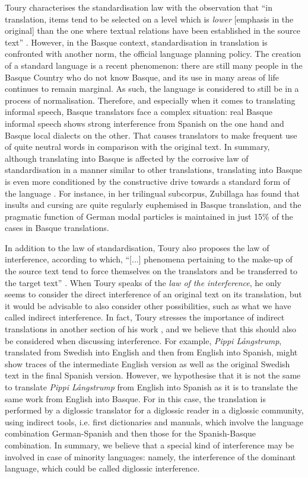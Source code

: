 \documentclass[output=paper]{LSP/langsci}
\begin{document}
Toury characterises the standardisation law with the observation that “in translation, items tend to be selected on a level which is \emph{lower} [emphasis in the original] than the one where textual relations have been established in the source text” \citep[305]{Toury2012}. However, in the Basque context, standardisation in translation is confronted with another norm, the official language planning policy. The creation of a standard language is a recent phenomenon: there are still many people in the Basque Country who do not know Basque, and its use in many areas of life continues to remain marginal. As such, the language is considered to still be in a process of normalisation. Therefore, and especially when it comes to translating informal speech, Basque translators face a complex situation: real Basque informal speech shows strong interference from Spanish on the one hand and Basque local dialects on the other. That causes translators to make frequent use of quite neutral words in comparison with the original text. In summary, although translating into Basque is affected by the corrosive law of standardisation in a manner similar to other translations, translating into Basque is even more conditioned by the constructive drive towards a standard form of the language \citep{Barambones2012}. For instance, in her trilingual subcorpus, Zubillaga has found that insults and cursing are quite regularly euphemised in Basque translation, and the pragmatic function of German modal particles is maintained in just 15\% of the cases in Basque translations.

In addition to the law of standardisation, Toury also proposes the law of interference, according to which, “[...] phenomena pertaining to the make-up of the source text tend to force themselves on the translators and be transferred to the target text” \citep[310]{Toury2012}. When Toury speaks of the \textit{law of the interference}, he only seems to consider the direct interference of an original text on its translation, but it would be advisable to also consider other possibilities, such as what we have called indirect interference. In fact, Toury stresses the importance of indirect translations in another section of his work \citep[129--146]{Toury1995}, and we believe that this should also be considered when discussing interference. For example, \textit{Pippi Långstrump}, translated from Swedish into English and then from English into Spanish, might show traces of the intermediate English version as well as the original Swedish text in the final Spanish version. However, we hypothesise that it is not the same to translate \textit{Pippi Långstrump} from English into Spanish as it is to translate the same work from English into Basque. For in this case, the translation is performed by a diglossic translator for a diglossic reader in a diglossic community, using indirect tools, i.e. first dictionaries and manuals, which involve the language combination German-Spanish and then those for the Spanish-Basque combination. In summary, we believe that a special kind of interference may be involved in case of minority languages: namely, the interference of the dominant language, which could be called diglossic interference.
\end{document}
